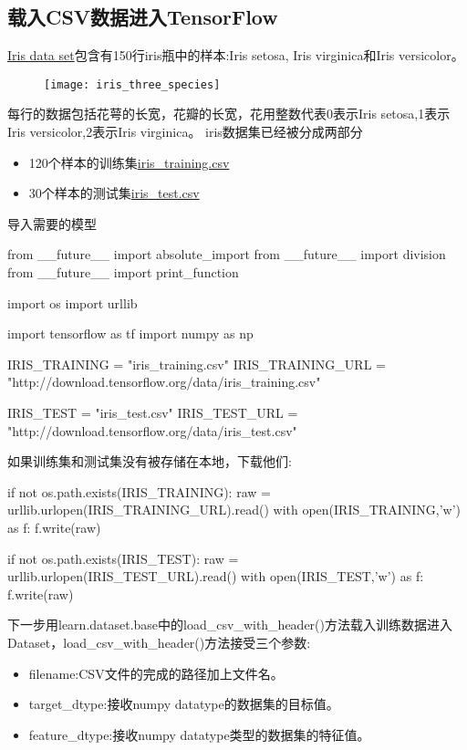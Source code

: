 \subsection{载入CSV数据进入TensorFlow}
\href{https://en.wikipedia.org/wiki/Iris_flower_data_set}{Iris data set}包含有150行iris瓶中的样本:Iris setosa, Iris virginica和Iris versicolor。
\begin{figure}[h]
\texttt{[image: iris\_three\_species]}
\end{figure}
每行的数据包括花萼的长宽，花瓣的长宽，花用整数代表0表示Iris setosa,1表示 Iris versicolor,2表示Iris virginica。
iris数据集已经被分成两部分
\begin{itemize}
	\item 120个样本的训练集\href{http://download.tensorflow.org/data/iris_training.csv}{iris_training.csv}
	\item 30个样本的测试集\href{http://download.tensorflow.org/data/iris_test.csv}{iris_test.csv}
\end{itemize}
导入需要的模型
\begin{python}
from __future__ import absolute_import
from __future__ import division
from __future__ import print_function

import os
import urllib

import tensorflow as tf
import numpy as np

IRIS_TRAINING = "iris_training.csv"
IRIS_TRAINING_URL = "http://download.tensorflow.org/data/iris_training.csv"

IRIS_TEST = "iris_test.csv"
IRIS_TEST_URL = "http://download.tensorflow.org/data/iris_test.csv"
\end{python}
如果训练集和测试集没有被存储在本地，下载他们:
\begin{python}
if not os.path.exists(IRIS_TRAINING):
  raw = urllib.urlopen(IRIS_TRAINING_URL).read()
  with open(IRIS_TRAINING,'w') as f:
    f.write(raw)

if not os.path.exists(IRIS_TEST):
  raw = urllib.urlopen(IRIS_TEST_URL).read()
  with open(IRIS_TEST,'w') as f:
    f.write(raw)
\end{python}
下一步用learn.dataset.base中的load\_csv\_with\_header()方法载入训练数据进入Dataset，load\_csv\_with\_header()方法接受三个参数:
\begin{itemize}
	\item filename:CSV文件的完成的路径加上文件名。
	\item target\_dtype:接收numpy datatype的数据集的目标值。
	\item feature\_dtype:接收numpy datatype类型的数据集的特征值。
\end{itemize}
